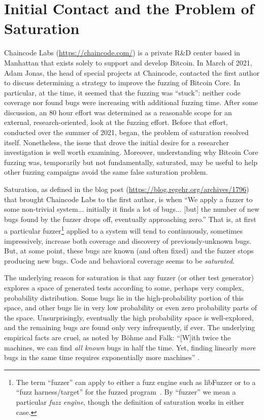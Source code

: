\section{Initial Contact and the Problem of Saturation}

Chaincode Labs (\url{https://chaincode.com/}) is a private R\&D center based in Manhattan that exists solely to support and develop Bitcoin.  In March of 2021, Adam Jonas, the head of special projects at Chaincode, contacted the first author to discuss determining a strategy to improve the fuzzing of Bitcoin Core.  In particular, at the time, it seemed that the fuzzing was ``stuck'': neither code coverage nor found bugs were increasing with additional fuzzing time.  After some discussion, an 80 hour effort was determined as a reasonable scope for an external, research-oriented, look at the fuzzing effort.  Before that effort, conducted over the summer of 2021, began, the problem of saturation resolved itself.  Nonetheless, the issue that drove the initial desire for a researcher investigation is well worth examining.  Moreover, understanding why Bitcoin Core fuzzing was, temporarily but not fundamentally, saturated, may be useful to help other fuzzing campaigns avoid the same false saturation problem.

Saturation, as defined in the blog post (\url{https://blog.regehr.org/archives/1796}) that brought Chaincode Labs to the first author, is when ``We apply a fuzzer to some non-trivial system... initially it finds a lot of bugs... [but] the number of new bugs found by the fuzzer drops off, eventually approaching zero.''  That is, at first a particular fuzzer\footnote{The term ``fuzzer'' can apply to either a fuzz engine such as libFuzzer or to a ``fuzz harness/target'' for the fuzzed program~\cite{WODACommon}.  By ``fuzzer'' we mean a particular \emph{fuzz engine}, though the definition of saturation works in either case.}  applied to a system will tend to continuously, sometimes impressively, increase both coverage and discovery of previously-unknown bugs.  But, at some point, these bugs are known (and often fixed) and the fuzzer stops producing new bugs.  Code and behavioral coverage seems to be \emph{saturated}.

The underlying reason for saturation is that any fuzzer (or other test generator) explores a space of generated tests according to some, perhaps very complex, probability distribution.  Some bugs lie in the high-probability portion of this space, and other bugs lie in very low probability or even zero probability parts of the space.  Unsurprisingly, eventually the high probability space is well-explored, and the remaining bugs are found only very infrequently, if ever.  The underlying empirical facts are cruel, as noted by B\"{o}hme and Falk:  ``[W]ith twice the machines, we can find \emph{all known} bugs in half the time. Yet, finding linearly \emph{more} bugs in the same time requires exponentially more machines'' \cite{fuzzexp}.

